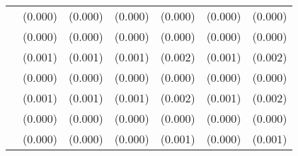 \begin{table}[htbp]
\begin{tabular}{l*{6}{c}}
                    &     (0.000)         &     (0.000)         &     (0.000)         &     (0.000)         &     (0.000)         &     (0.000)         \\
                    &     (0.000)         &     (0.000)         &     (0.000)         &     (0.000)         &     (0.000)         &     (0.000)         \\
                    &     (0.001)         &     (0.001)         &     (0.001)         &     (0.002)         &     (0.001)         &     (0.002)         \\
                    &     (0.000)         &     (0.000)         &     (0.000)         &     (0.000)         &     (0.000)         &     (0.000)         \\
                    &     (0.001)         &     (0.001)         &     (0.001)         &     (0.002)         &     (0.001)         &     (0.002)         \\
                    &     (0.000)         &     (0.000)         &     (0.000)         &     (0.000)         &     (0.000)         &     (0.000)         \\
                    &     (0.000)         &     (0.000)         &     (0.000)         &     (0.001)         &     (0.000)         &     (0.001)         \\

\end{tabular}
\end{table}
